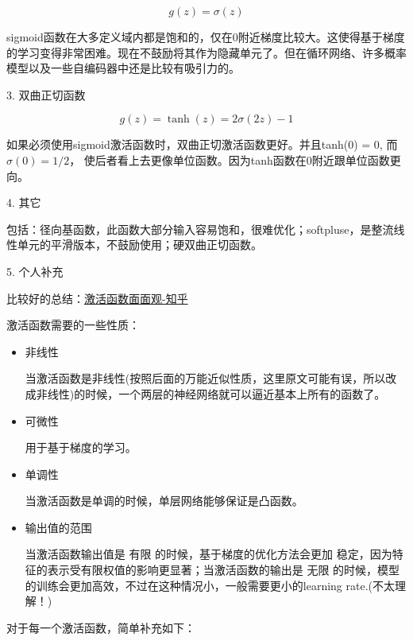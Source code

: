 \begin{displaymath}
g(z) = \sigma(z)
\end{displaymath}

sigmoid函数在大多定义域内都是饱和的，仅在0附近梯度比较大。这使得基于梯度的学习变得非常困难。现在不鼓励将其作为隐藏单元了。但在循环网络、许多概率模型以及一些自编码器中还是比较有吸引力的。

3. 双曲正切函数

\begin{displaymath}
g(z) = \tanh(z) = 2\sigma(2z) - 1
\end{displaymath}

如果必须使用sigmoid激活函数时，双曲正切激活函数更好。并且tanh(0) = 0, 而$\sigma(0) = 1/2$， 使后者看上去更像单位函数。因为tanh函数在0附近跟单位函数更向。

4. 其它

包括：径向基函数，此函数大部分输入容易饱和，很难优化；softpluse，是整流线性单元的平滑版本，不鼓励使用；硬双曲正切函数。

5. 个人补充

比较好的总结：\href{https://zhuanlan.zhihu.com/p/21568660}{激活函数面面观-知乎}

激活函数需要的一些性质：
\begin{itemize}
\item 非线性

当激活函数是非线性(按照后面的万能近似性质，这里原文可能有误，所以改成非线性)的时候，一个两层的神经网络就可以逼近基本上所有的函数了。

\item 可微性

用于基于梯度的学习。

\item 单调性

当激活函数是单调的时候，单层网络能够保证是凸函数。

\item 输出值的范围

当激活函数输出值是 有限 的时候，基于梯度的优化方法会更加 稳定，因为特征的表示受有限权值的影响更显著；当激活函数的输出是 无限 的时候，模型的训练会更加高效，不过在这种情况小，一般需要更小的learning rate.(不太理解！)

\end{itemize}

对于每一个激活函数，简单补充如下：

